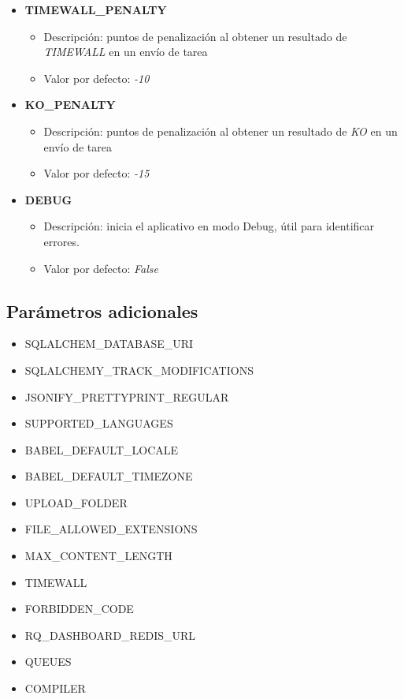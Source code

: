 \documentclass[11pt,spanish,listoffigures,listoftables]{tfgetsinf}
\begin{document}
\begin{itemize}
	\item \textbf{TIMEWALL\_PENALTY}
	\begin{itemize}
		\item Descripción: puntos de penalización al obtener un resultado de \textit{TIMEWALL} en un envío de \Gls{tarea}
		\item Valor por defecto: \textit{-10}
	\end{itemize}
\end{itemize}

\begin{itemize}
	\item \textbf{KO\_PENALTY}
	\begin{itemize}
		\item Descripción: puntos de penalización al obtener un resultado de \textit{KO} en un envío de \Gls{tarea}
		\item Valor por defecto: \textit{-15}
	\end{itemize}
\end{itemize}

\begin{itemize}
	\item \textbf{DEBUG}
	\begin{itemize}
		\item Descripción: inicia el aplicativo en modo Debug, útil para identificar errores.
		\item Valor por defecto: \textit{False}
	\end{itemize}
\end{itemize}

\subsection*{Parámetros adicionales}

\begin{itemize}
	\item SQLALCHEM\_DATABASE\_URI
	\item SQLALCHEMY\_TRACK\_MODIFICATIONS
	\item JSONIFY\_PRETTYPRINT\_REGULAR
	\item SUPPORTED\_LANGUAGES
	\item BABEL\_DEFAULT\_LOCALE
	\item BABEL\_DEFAULT\_TIMEZONE
	\item UPLOAD\_FOLDER
	\item FILE\_ALLOWED\_EXTENSIONS
	\item MAX\_CONTENT\_LENGTH
	\item TIMEWALL
	\item FORBIDDEN\_CODE
	\item RQ\_DASHBOARD\_REDIS\_URL
	\item QUEUES
	\item COMPILER
\end{itemize}
\end{document}
